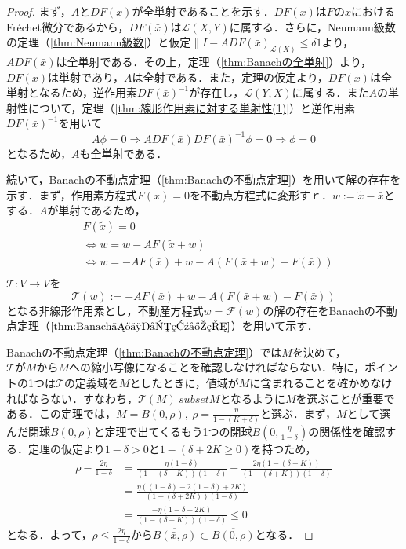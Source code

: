 \documentclass[11pt,a4paper,titlepage]{jsreport}
\theoremstyle{definition}
\begin{document}
\begin{proof}
  まず，$AとDF(\bar{x})$が全単射であることを示す．$DF(\bar{x})$は$Fの\bar{x}$におけるFr\'{e}chet微分であるから，$DF(\bar{x})$は$\mathcal{L}(X,Y)$に属する．さらに，Neumann級数の定理（\ref{thm:Neumann級数}）と仮定$\|I-ADF(\bar{x})_{\mathcal{L}(X)}\leq \delta 1$より，$ADF(\bar{x})$は全単射である．その上，定理（\ref{thm:Banachの全単射}）より，$DF(\bar{x})$は単射であり，$A$は全射である．また，定理の仮定より，$DF(\bar{x})$は全単射となるため，逆作用素$DF(\bar{x})^{-1}$が存在し，$\mathcal{L}(Y,X)$に属する．また$A$の単射性について，定理（\ref{thm:線形作用素に対する単射性(1)}）と逆作用素$DF(\bar{x})^{-1}$を用いて
  \begin{equation*}
    A\phi = 0 \Rightarrow ADF(\bar{x}) DF(\bar{x})^{-1}\phi = 0 \Rightarrow \phi = 0
  \end{equation*}
  となるため，$A$も全単射である．

  続いて，Banachの不動点定理（\ref{thm:Banachの不動点定理}）を用いて解の存在を示す．まず，作用素方程式$F(x)=0$を不動点方程式に変形すｒ．$w:=\tilde{x}-\bar{x}$とする．$A$が単射であるため，
  \begin{align*}
     & F(\tilde{x})=0                                                    \\
     & \Leftrightarrow w = w-AF(\tilde{x} + w)                           \\
     & \Leftrightarrow w = -AF(\bar{x}) + w - A(F(\bar{x}+w)-F(\bar{x})) \\
  \end{align*}
  $\mathcal{T}: V \rightarrow V$を
  \begin{equation*}
    \mathcal{T}(w) := -AF(\bar{x}) + w - A(F(\bar{x}+w)-F(\bar{x}))
  \end{equation*}
  となる非線形作用素とし，不動産方程式$w=\mathcal{F}(w)$の解の存在をBanachの不動点定理（$\ref{thm:Banachの不動点定理}$）を用いて示す．

  Banachの不動点定理（\ref{thm:Banachの不動点定理}）では$M$を決めて，$\mathcal{T}がMからMへ$の縮小写像になることを確認しなければならない．特に，ポイントの1つは$\mathcal{T}$の定義域を$M$としたときに，値域が$M$に含まれることを確かめなければならない．すなわち，$\mathcal{T}(M) \ subset M$となるように$M$を選ぶことが重要である．この定理では，$M=\overline{B(0,\rho)},\ \rho = \frac{\eta}{1-(K+\delta)}$と選ぶ．まず，$M$として選んだ閉球$\overline{B(0,\rho)}$と定理で出てくるもう1つの閉球$B\left(0, \frac{\eta}{1-\delta}\right)$の関係性を確認する．定理の仮定より$1-\delta>0$と$1-\left(\delta + 2K\geq 0\right)$を持つため，
  \begin{align*}
    \rho - \frac{2\eta}{1-\delta} & = \frac{\eta(1-\delta)}{(1-(\delta+K))(1-\delta)}-\frac{2\eta(1-(\delta +K))}{(1-(\delta+K))(1-\delta)} \\
                                  & = \frac{\eta((1-\delta)-2(1-\delta)+2K)}{(1-(\delta+2K))(1-\delta)}                                     \\
                                  & = \frac{-\eta(1-\delta-2K)}{(1-(\delta+K))(1-\delta)}
    \leq 0
  \end{align*}
  となる．よって，$\rho\leq\frac{2\eta}{1-\delta}$から$\overline{B(\bar{x},\rho)}\subset \overline{B\left(0,\rho\right)}$となる．


\end{proof}
\end{document}
